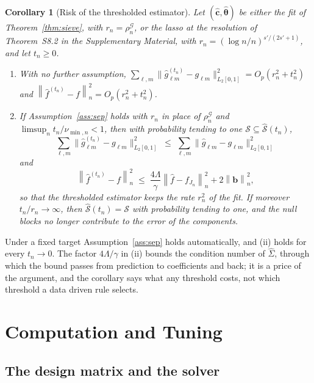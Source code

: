 \documentclass[12pt]{article} %
\newtheorem{corollary}{Corollary}
\theoremstyle{definition}
\theoremstyle{plain}
\newcommand{\normn}[1]{\left\lVert #1 \right\rVert_{n}}
\newcommand{\cv}{\ell}
\newcommand{\md}{m}
\newcommand{\gcomp}[2]{g_{#1#2}}
\newcommand{\btheta}{\boldsymbol{\theta}}
\newcommand{\thetahat}{\widehat{\btheta}}
\newcommand{\chat}{\widehat{\mathbf{c}}}
\newcommand{\Gramhat}{\widehat{\Sigma}}
\newcommand{\seff}{s'}
\newcommand{\bb}{\mathbf{b}}
\newcommand{\rhoG}{\rho^{\mathcal{G}}_{n}}
\begin{document}
{\begin{corollary}[Risk of the thresholded estimator]
\label{cor:thrisk}
Let $(\chat,\thetahat)$ be either the fit of Theorem~\ref{thm:sieve}, with
$r_n = \rhoG$, or the lasso at the resolution of Theorem~S8.2 in the
Supplementary Material, with $r_n = (\log n/n)^{\seff/(2\seff+1)}$, and let
$t_n \ge 0$.
\begin{enumerate}
\item[(i)] With no further assumption,
$\sum_{\cv,\md}\lVert\widehat{g}^{(t_n)}_{\cv\md}-\gcomp{\cv}{\md}\rVert_{L_2[0,1]}^{2}
= O_p(r_n^{2} + t_n^{2})$ and
$\normn{\widehat{f}^{(t_n)}-f}^{2} = O_p(r_n^{2} + t_n^{2})$.
\item[(ii)] If Assumption~\ref{ass:sep} holds with $r_n$ in place of $\rhoG$
and $\limsup_n t_n/\nu_{\min,n} < 1$, then with probability tending to one
$\mathcal{S} \subseteq \widehat{\mathcal{S}}(t_n)$,
\[
  \sum_{\cv,\md}\lVert\widehat{g}^{(t_n)}_{\cv\md}-\gcomp{\cv}{\md}\rVert_{L_2[0,1]}^{2}
  \;\le\; \sum_{\cv,\md}\lVert\widehat{g}_{\cv\md}-\gcomp{\cv}{\md}\rVert_{L_2[0,1]}^{2}
\]
and
\[
  \normn{\widehat{f}^{(t_n)}-f}^{2} \;\le\;
  \frac{4\Lambda}{\gamma}\normn{\widehat{f}-f_{J_n}}^{2} + 2\normn{\bb}^{2},
\]
so that the thresholded estimator keeps the rate $r_n^{2}$ of the fit. If
moreover $t_n/r_n \to \infty$, then
$\widehat{\mathcal{S}}(t_n) = \mathcal{S}$ with probability tending to one,
and the null blocks no longer contribute to the error of the components.
\end{enumerate}
\end{corollary}

Under a fixed target Assumption~\ref{ass:sep} holds automatically, and (ii)
holds for every $t_n \to 0$. The factor $4\Lambda/\gamma$ in (ii) bounds the
condition number of $\Gramhat$, through which the bound passes from
prediction to coefficients and back; it is a price of the argument, and the
corollary says what any threshold costs, not which threshold a data driven
rule selects.
}

\section{Computation and Tuning}
\label{sec:computation}

\subsection{The design matrix and the solver}
\label{sec:solver}
\end{document}
